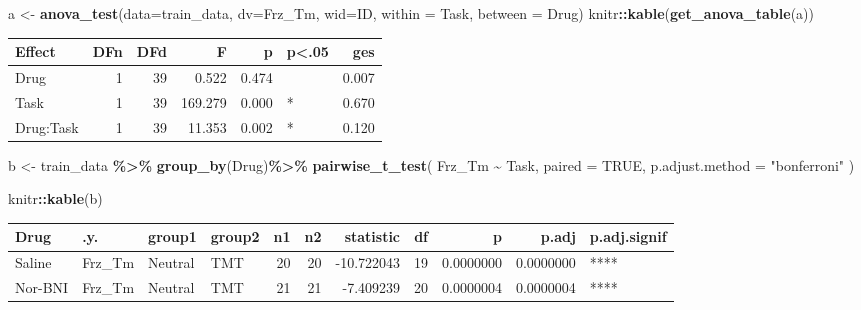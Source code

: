 \documentclass[
]{book}
\newenvironment{Shaded}{\begin{snugshade}}{\end{snugshade}}
\newcommand{\AttributeTok}[1]{\textcolor[rgb]{0.13,0.29,0.53}{#1}}
\newcommand{\ConstantTok}[1]{\textcolor[rgb]{0.56,0.35,0.01}{#1}}
\newcommand{\FunctionTok}[1]{\textcolor[rgb]{0.13,0.29,0.53}{\textbf{#1}}}
\newcommand{\NormalTok}[1]{#1}
\newcommand{\OtherTok}[1]{\textcolor[rgb]{0.56,0.35,0.01}{#1}}
\newcommand{\SpecialCharTok}[1]{\textcolor[rgb]{0.81,0.36,0.00}{\textbf{#1}}}
\newcommand{\StringTok}[1]{\textcolor[rgb]{0.31,0.60,0.02}{#1}}
\begin{document}
\begin{Shaded}
\begin{Highlighting}[]
\NormalTok{a }\OtherTok{\textless{}{-}} \FunctionTok{anova\_test}\NormalTok{(}\AttributeTok{data=}\NormalTok{train\_data, }\AttributeTok{dv=}\NormalTok{Frz\_Tm, }\AttributeTok{wid=}\NormalTok{ID, }\AttributeTok{within =}\NormalTok{ Task, }\AttributeTok{between =}\NormalTok{ Drug)}
\NormalTok{knitr}\SpecialCharTok{::}\FunctionTok{kable}\NormalTok{(}\FunctionTok{get\_anova\_table}\NormalTok{(a))}
\end{Highlighting}
\end{Shaded}

\begin{tabular}{l|r|r|r|r|l|r}
\hline
Effect & DFn & DFd & F & p & p<.05 & ges\\
\hline
Drug & 1 & 39 & 0.522 & 0.474 &  & 0.007\\
\hline
Task & 1 & 39 & 169.279 & 0.000 & * & 0.670\\
\hline
Drug:Task & 1 & 39 & 11.353 & 0.002 & * & 0.120\\
\hline
\end{tabular}

\begin{Shaded}
\begin{Highlighting}[]
\NormalTok{b }\OtherTok{\textless{}{-}}\NormalTok{ train\_data }\SpecialCharTok{\%\textgreater{}\%}
  \FunctionTok{group\_by}\NormalTok{(Drug)}\SpecialCharTok{\%\textgreater{}\%}
  \FunctionTok{pairwise\_t\_test}\NormalTok{(}
\NormalTok{  Frz\_Tm }\SpecialCharTok{\textasciitilde{}}\NormalTok{ Task, }\AttributeTok{paired =} \ConstantTok{TRUE}\NormalTok{,}
  \AttributeTok{p.adjust.method =} \StringTok{"bonferroni"}
\NormalTok{  )}

\NormalTok{knitr}\SpecialCharTok{::}\FunctionTok{kable}\NormalTok{(b)}
\end{Highlighting}
\end{Shaded}

\begin{tabular}{l|l|l|l|r|r|r|r|r|r|l}
\hline
Drug & .y. & group1 & group2 & n1 & n2 & statistic & df & p & p.adj & p.adj.signif\\
\hline
Saline & Frz\_Tm & Neutral & TMT & 20 & 20 & -10.722043 & 19 & 0.0000000 & 0.0000000 & ****\\
\hline
Nor-BNI & Frz\_Tm & Neutral & TMT & 21 & 21 & -7.409239 & 20 & 0.0000004 & 0.0000004 & ****\\
\hline
\end{tabular}
\end{document}
